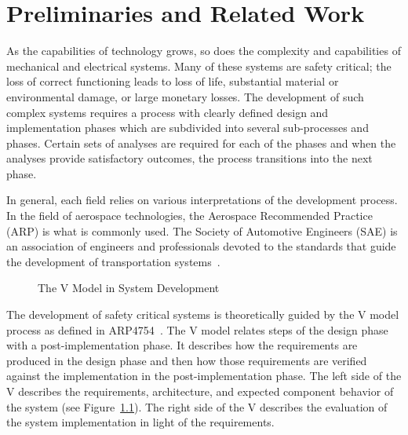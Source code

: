 \chapter{Preliminaries and Related Work}
\label{chap:prelim}
As the capabilities of technology grows, so does the complexity and capabilities of mechanical and electrical systems. Many of these systems are safety critical; the loss of correct functioning leads to loss of life, substantial material or environmental damage, or large monetary losses. The development of such complex systems requires a process with clearly defined design and implementation phases which are subdivided into several sub-processes and phases. Certain sets of analyses are required for each of the phases and when the analyses provide satisfactory outcomes, the process transitions into the next phase. 

In general, each field relies on various interpretations of the development process. In the field of aerospace technologies, the Aerospace Recommended Practice (ARP) is what is commonly used. The Society of Automotive Engineers (SAE) is an association of engineers and professionals devoted to the standards that guide the development of transportation systems~\cite{SAE:ARP4761, SAE:ARP4754A}. 

\begin{figure}[!htb]
        \caption{\label{fig:v1} The V Model in System Development}
\end{figure}

The development of safety critical systems is theoretically guided by the V model process as defined in ARP4754~\cite{SAE:ARP4754A}. The V model relates steps of the design phase with a post-implementation phase. It describes how the requirements are produced in the design phase and then how those requirements are verified against the implementation in the post-implementation phase. The left side of the V describes the requirements, architecture, and expected component behavior of the system (see Figure~\ref{fig:v1}). The right side of the V describes the evaluation of the system implementation in light of the requirements. 













%
%
%
